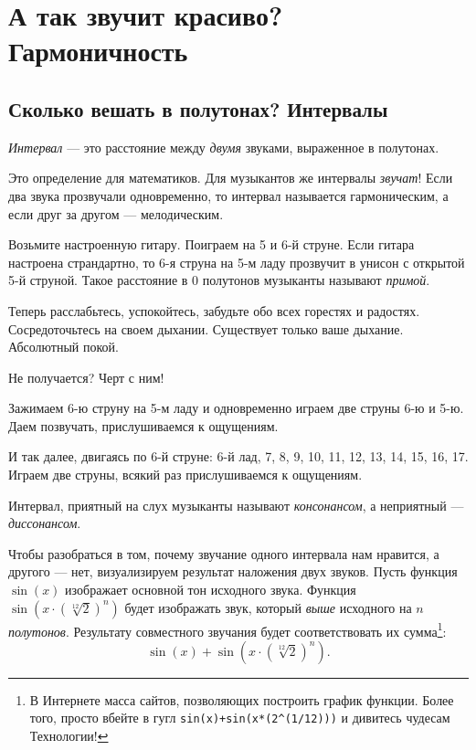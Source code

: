 \chapter{А так звучит красиво? Гармоничность}
\label{ch:harmony}


\section{Сколько вешать в полутонах? Интервалы}
\label{ch:harmony:interval}

\begin{Definition}[Интервал]
    \emph{Интервал} --- это расстояние между \emph{двумя} звуками, выраженное в полутонах. 
\end{Definition}

Это определение для математиков. Для музыкантов же интервалы \emph{звучат}! Если два звука прозвучали одновременно, то интервал называется гармоническим, а если друг за другом --- мелодическим.

\begin{Example}
    \label{ex:harmony:interval:string5and6}
    Возьмите настроенную гитару. Поиграем на 5 и 6-й струне. Если гитара настроена страндартно, то 6-я струна на 5-м ладу прозвучит в унисон с открытой 5-й струной. Такое расстояние в 0 полутонов музыканты называют \emph{примой}. 
    
    Теперь расслабьтесь, успокойтесь, забудьте обо всех горестях и радостях. Сосредоточьтесь на своем дыхании. Существует только ваше дыхание. Абсолютный покой. 
    
    Не получается? Черт с ним!
    
    Зажимаем 6-ю струну на 5-м ладу и одновременно играем две струны 6-ю и 5-ю. Даем позвучать, прислушиваемся к ощущениям.
    
    И так далее, двигаясь по 6-й струне: 6-й лад, 7, 8, 9, 10, 11, 12, 13, 14, 15, 16, 17. Играем две струны, всякий раз прислушиваемся к ощущениям.
\end{Example}

Интервал, приятный на слух музыканты называют \emph{консонансом}, а неприятный --- \emph{диссонансом}. 

Чтобы разобраться в том, почему звучание одного интервала нам нравится, а другого --- нет, визуализируем результат наложения двух звуков. Пусть функция $\sin(x)$ изображает основной тон исходного звука. Функция $\sin(x\cdot(\sqrt[12]{2})^n)$ будет изображать звук, который \emph{выше} исходного на $n$ \emph{полутонов}. Результату совместного звучания будет соответствовать их сумма\footnote{В Интернете масса сайтов, позволяющих построить график функции. Более того, просто вбейте в гугл \texttt{sin(x)+sin(x*(2\^{}(1/12)))} и дивитесь чудесам Технологии!}:
\begin{equation}
    \label{eq:harmony:interval:sin}
    \sin(x) + \sin(x\cdot(\sqrt[12]{2})^n).
\end{equation}

